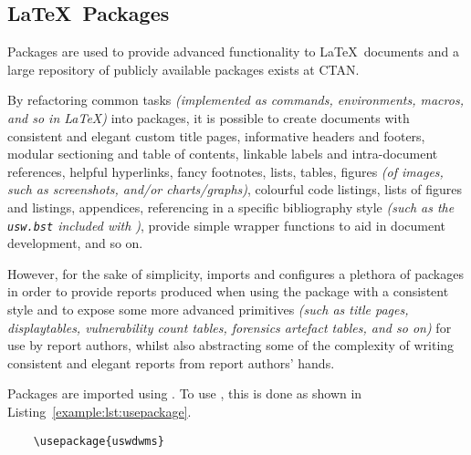 \subsection{\LaTeX\ Packages}
Packages are used to provide advanced functionality to \LaTeX\ documents and a large repository of publicly available packages exists at CTAN.

By refactoring common tasks \textit{(implemented as commands, environments, macros, and so in \LaTeX{})} into packages, it is possible to create documents with consistent and elegant custom title pages, informative headers and footers, modular sectioning and table of contents, linkable labels and intra-document references, helpful hyperlinks, fancy footnotes, lists, tables, figures \textit{(of images, such as screenshots, and/or charts/graphs)}, colourful code listings, lists of figures and listings, appendices, referencing in a specific bibliography style \textit{(such as the \texttt{usw.bst} included with \uswdwmspkg{})}, provide simple wrapper functions to aid in document development, and so on.

However, for the sake of simplicity, \uswdwmspkg{} imports and configures a plethora of packages in order to provide reports produced when using the package with a consistent style and to expose some more advanced primitives \textit{(such as title pages, displaytables, vulnerability count tables, forensics artefact tables, and so on)} for use by report authors, whilst also abstracting some of the complexity of writing consistent and elegant reports from report authors' hands.

Packages are imported using . To use \uswdwmspkg{}, this is done as shown in Listing~\ref{example:lst:usepackage}.


\begin{listing}[H]
  \captionsetup{skip=\skiplistingcaptionlen}
  \begin{verbatim}
    \usepackage{uswdwms}
  \end{verbatim}
  \caption{\LaTeX\ \texttt{\textbackslash usepackage} command example}
  \label{example:lst:usepackage}
\end{listing}
